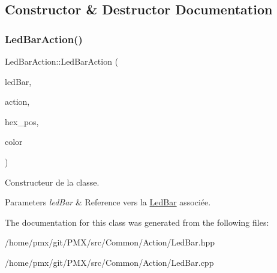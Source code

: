 \subsection{Constructor \& Destructor Documentation}
\mbox{\label{classLedBarAction_adcaf979c06f6f0db45ebc191526bbcf5}} 
\subsubsection{\texorpdfstring{Led\+Bar\+Action()}{LedBarAction()}}
{\footnotesize\ttfamily Led\+Bar\+Action\+::\+Led\+Bar\+Action (\begin{DoxyParamCaption}\item[{\hyperlink{classLedBar}{Led\+Bar} \&}]{led\+Bar,  }\item[{Led\+Bar\+Action\+Name}]{action,  }\item[{uint}]{hex\+\_\+pos,  }\item[{Led\+Color}]{color }\end{DoxyParamCaption})}



Constructeur de la classe. 


\begin{DoxyParams}{Parameters}
{\em led\+Bar} & Reference vers la \hyperlink{classLedBar}{Led\+Bar} associée. \\
\hline
\end{DoxyParams}


The documentation for this class was generated from the following files\+:\begin{DoxyCompactItemize}
\item 
/home/pmx/git/\+P\+M\+X/src/\+Common/\+Action/Led\+Bar.\+hpp\item 
/home/pmx/git/\+P\+M\+X/src/\+Common/\+Action/Led\+Bar.\+cpp\end{DoxyCompactItemize}
